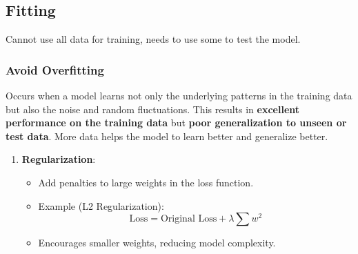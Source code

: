 \documentclass[11pt, english]{article}
\begin{document}
\subsection{Fitting}
Cannot use all data for training, needs to use some to test the model. 
\subsubsection{\textbf{Avoid Overfitting}}
Occurs when a model learns not only the underlying patterns in the training data but also the noise and random fluctuations. This results in \textbf{excellent performance on the training data} but \textbf{poor generalization to unseen or test data}.
More data helps the model to learn better and generalize better.
\begin{enumerate}
    \item \textbf{Regularization}:
    \begin{itemize}
        \item Add penalties to large weights in the loss function.
        \item Example (L2 Regularization): 
        \[
        \text{Loss} = \text{Original Loss} + \lambda \sum w^2
        \]
        \item Encourages smaller weights, reducing model complexity.
    \end{itemize}
    

\end{enumerate}
\end{document}

